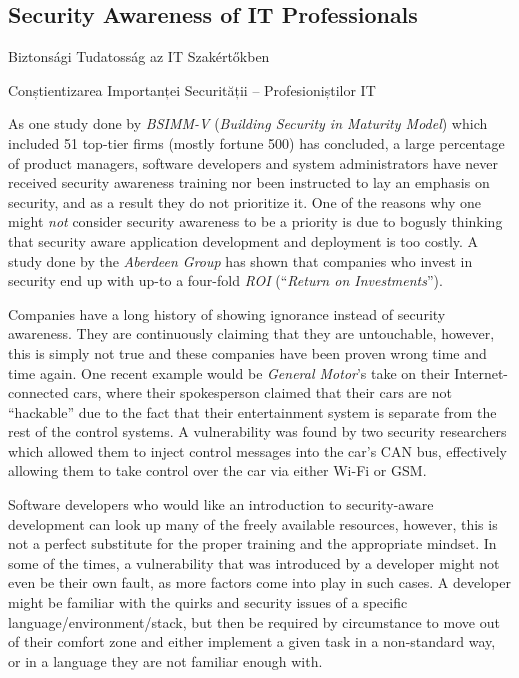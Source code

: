 \documentclass[a4paper,12pt]{article}
\newcommand\subsectionhu[1]{\addcontentsline{toc.hu}{subsection} {\protect\numberline{\thesubsection} #1}}
\newcommand\subsectionro[1]{\addcontentsline{toc.ro}{subsection} {\protect\numberline{\thesubsection} #1}}
\begin{document}
\subsection{Security Awareness of IT Professionals}
\subsectionhu{Biztonsági Tudatosság az IT Szakértőkben} \subsectionro{Conștientizarea Importanței Securității -- Profesioniștilor IT}
	
	As one study done by \textit{BSIMM-V} (\textit{Building Security in Maturity Model}) which included 51 top-tier firms (mostly fortune 500) has concluded\cite{gmcgraw12}, a large percentage of product managers, software developers and system administrators have never received security awareness training nor been instructed to lay an emphasis on security, and as a result they do not prioritize it. One of the reasons why one might \textit{not} consider security awareness to be a priority is due to bogusly thinking that security aware application development and deployment is too costly. A study done by the \textit{Aberdeen Group} has shown that companies who invest in security end up with up-to a four-fold \textit{ROI} (``\textit{Return on Investments}'').\cite{aberdeen11}
	
	Companies have a long history of showing ignorance instead of security awareness. They are continuously claiming that they are untouchable, however, this is simply not true and these companies have been proven wrong time and time again. One recent example would be \textit{General Motor}'s take on their Internet-connected cars, where their spokesperson claimed that their cars are not ``hackable'' due to the fact that their entertainment system is separate from the rest of the control systems. A vulnerability was found by two security researchers\cite{cmiller15} which allowed them to inject control messages into the car's CAN bus, effectively allowing them to take control over the car via either Wi-Fi or GSM.
	
	Software developers who would like an introduction to security-aware development can look up many of the freely available resources, however, this is not a perfect substitute for the proper training and the appropriate mindset. In some of the times, a vulnerability that was introduced by a developer might not even be their own fault, as more factors come into play in such cases. A developer might be familiar with the quirks and security issues of a specific language/environment/stack, but then be required by circumstance to move out of their comfort zone and either implement a given task in a non-standard way, or in a language they are not familiar enough with.
	
\end{document}
